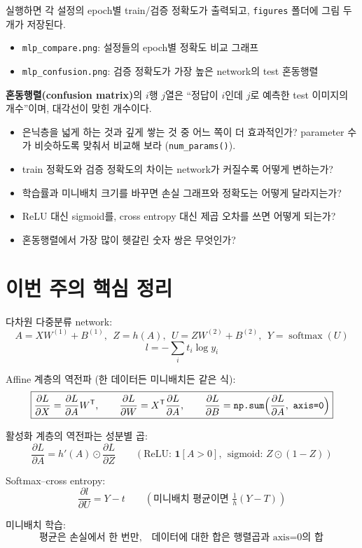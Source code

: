 \documentclass[11pt,a4paper]{article}
\newcommand{\T}{^{\mathsf T}}
\newcommand{\pd}[2]{\frac{\partial #1}{\partial #2}}
\newcommand{\softmax}{\operatorname{softmax}}
\begin{document}
실행하면 각 설정의 epoch별 train/검증 정확도가 출력되고, \texttt{figures} 폴더에 그림 두 개가 저장된다.
\begin{itemize}[leftmargin=1.8em]
\item \texttt{mlp\_compare.png}: 설정들의 epoch별 정확도 비교 그래프
\item \texttt{mlp\_confusion.png}: 검증 정확도가 가장 높은 network의 test 혼동행렬
\end{itemize}
\textbf{혼동행렬(confusion matrix)}의 $i$행 $j$열은 ``정답이 $i$인데 $j$로 예측한 test 이미지의 개수''이며,
대각선이 맞힌 개수이다.

\begin{thinkbox}
\begin{itemize}[leftmargin=1.5em]
\item 은닉층을 넓게 하는 것과 깊게 쌓는 것 중 어느 쪽이 더 효과적인가?
parameter 수가 비슷하도록 맞춰서 비교해 보라 (\texttt{num\_params()}).
\item train 정확도와 검증 정확도의 차이는 network가 커질수록 어떻게 변하는가?
\item 학습률과 미니배치 크기를 바꾸면 손실 그래프와 정확도는 어떻게 달라지는가?
\item ReLU 대신 sigmoid를, cross entropy 대신 제곱 오차를 쓰면 어떻게 되는가?
\item 혼동행렬에서 가장 많이 헷갈린 숫자 쌍은 무엇인가?
\end{itemize}
\end{thinkbox}


\section{이번 주의 핵심 정리}

\begin{keybox}[핵심 구조]
다차원 다중분류 network:
\[
\boxed{
A=XW^{(1)}+B^{(1)},\ \ Z=h(A),\ \ U=ZW^{(2)}+B^{(2)},\ \ Y=\softmax(U)
}
\]
\[
\boxed{
l=-\sum_i t_i\log y_i
}
\]

Affine 계층의 역전파 (한 데이터든 미니배치든 같은 식):
\[
\boxed{
\pd{L}{X}=\pd{L}{A}W\T,\qquad \pd{L}{W}=X\T\pd{L}{A},\qquad \pd{L}{B}=\texttt{np.sum}\Bigl(\pd{L}{A},\ \texttt{axis=0}\Bigr)
}
\]

활성화 계층의 역전파는 성분별 곱:
\[
\boxed{
\pd{L}{A}=h'(A)\odot\pd{L}{Z}
}
\qquad(\text{ReLU: }\mathbf{1}[A>0],\ \ \text{sigmoid: }Z\odot(1-Z))
\]

Softmax--cross entropy:
\[
\boxed{
\pd{l}{U}=Y-t
}
\qquad(\text{미니배치 평균이면 }\tfrac1h(Y-T))
\]

미니배치 학습:
\[
\boxed{
\text{평균은 손실에서 한 번만},\quad \text{데이터에 대한 합은 행렬곱과 axis=0의 합}
}
\]
\end{keybox}
\end{document}
